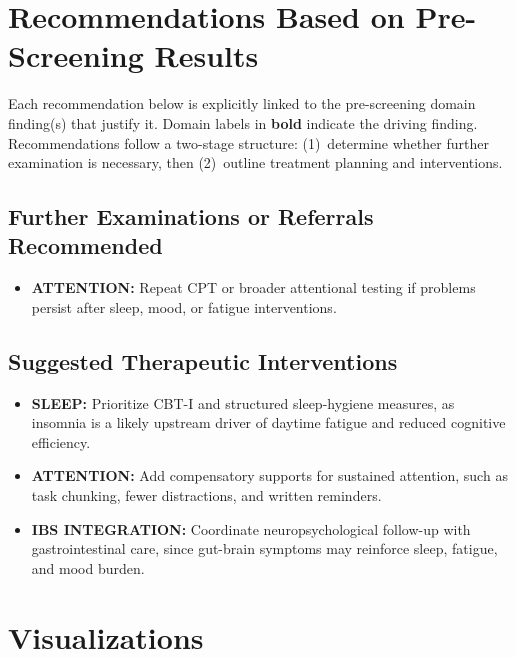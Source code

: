 \documentclass[11pt,a4paper]{article}
\begin{document}
\section{Recommendations Based on Pre-Screening Results}

Each recommendation below is explicitly linked to the pre-screening domain finding(s) that justify it. Domain labels in \textbf{bold} indicate the driving finding. Recommendations follow a two-stage structure: (1)~determine whether further examination is necessary, then (2)~outline treatment planning and interventions.

\subsection{Further Examinations or Referrals Recommended}
\begin{itemize}[leftmargin=*]
  \item \textbf{ATTENTION:} Repeat CPT or broader attentional testing if problems persist after sleep, mood, or fatigue interventions.
\end{itemize}

\subsection{Suggested Therapeutic Interventions}
\begin{itemize}[leftmargin=*]
  \item \textbf{SLEEP:} Prioritize CBT-I and structured sleep-hygiene measures, as insomnia is a likely upstream driver of daytime fatigue and reduced cognitive efficiency.
  \item \textbf{ATTENTION:} Add compensatory supports for sustained attention, such as task chunking, fewer distractions, and written reminders.
  \item \textbf{IBS INTEGRATION:} Coordinate neuropsychological follow-up with gastrointestinal care, since gut-brain symptoms may reinforce sleep, fatigue, and mood burden.
\end{itemize}

\newpage
\section{Visualizations}
\end{document}
